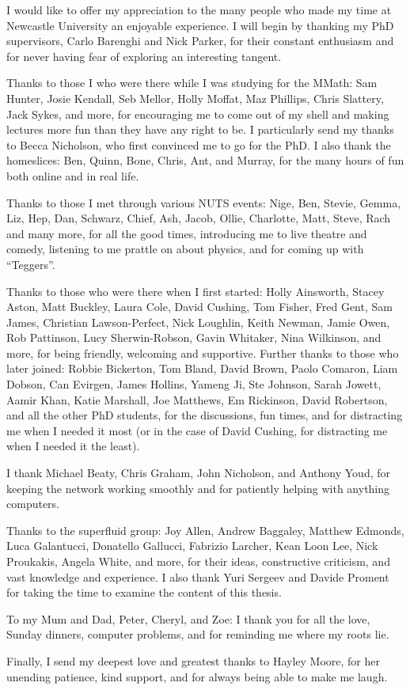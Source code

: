 \begin{acknowledgements}
 I would like to offer my appreciation to the many people who made my time at Newcastle University an enjoyable experience. I will begin by thanking my PhD supervisors, Carlo Barenghi and Nick Parker, for their constant enthusiasm and for never having fear of exploring an interesting tangent.

 Thanks to those I who were there while I was studying for the MMath: Sam Hunter, Josie Kendall, Seb Mellor, Holly Moffat, Maz Phillips, Chris Slattery, Jack Sykes, and more, for encouraging me to come out of my shell and making lectures more fun than they have any right to be. I particularly send my thanks to Becca Nicholson, who first convinced me to go for the PhD. I also thank the homeslices: Ben, Quinn, Bone, Chris, Ant, and Murray, for the many hours of fun both online and in real life.

 Thanks to those I met through various NUTS events: Nige, Ben, Stevie, Gemma, Liz, Hep, Dan, Schwarz, Chief, Ash, Jacob, Ollie, Charlotte, Matt, Steve, Rach and many more, for all the good times, introducing me to live theatre and comedy, listening to me prattle on about physics, and for coming up with ``Teggers''. 

 Thanks to those who were there when I first started: Holly Ainsworth, Stacey Aston, Matt Buckley, Laura Cole, David Cushing, Tom Fisher, Fred Gent, Sam James, Christian Lawson-Perfect, Nick Loughlin, Keith Newman, Jamie Owen, Rob Pattinson, Lucy Sherwin-Robson, Gavin Whitaker, Nina Wilkinson, and more, for being friendly, welcoming and supportive. Further thanks to those who later joined: Robbie Bickerton, Tom Bland, David Brown, Paolo Comaron, Liam Dobson, Can Evirgen, James Hollins, Yameng Ji, Ste Johnson, Sarah Jowett, Aamir Khan, Katie Marshall, Joe Matthews, Em Rickinson, David Robertson, and all the other PhD students, for the discussions, fun times, and for distracting me when I needed it most (or in the case of David Cushing, for distracting me when I needed it the least).

 I thank Michael Beaty, Chris Graham, John Nicholson, and Anthony Youd, for keeping the network working smoothly and for patiently helping with anything computers.

 Thanks to the superfluid group: Joy Allen, Andrew Baggaley, Matthew Edmonds, Luca Galantucci, Donatello Gallucci, Fabrizio Larcher, Kean Loon Lee, Nick Proukakis, Angela White, and more, for their ideas, constructive criticism, and vast knowledge and experience. I also thank Yuri Sergeev and Davide Proment for taking the time to examine the content of this thesis.

 To my Mum and Dad, Peter, Cheryl, and Zoe: I thank you for all the love, Sunday dinners, computer problems, and for reminding me where my roots lie.

 Finally, I send my deepest love and greatest thanks to Hayley Moore, for her unending patience, kind support, and for always being able to make me laugh.


\end{acknowledgements}
\thispagestyle{empty}
\restoregeometry
